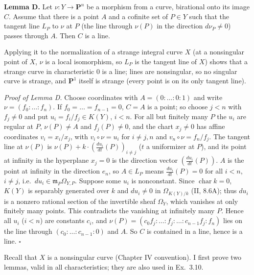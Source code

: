\documentclass[11pt]{article}
\begin{document}
\textbf{Lemma D.} Let $\nu:Y\to\mathbf P^n$ be a morphism from a curve, birational onto its image $C$. Assume that there is a point $A$ and a cofinite set of $P\in Y$ such that the tangent line $L_P$ to $\nu$ at $P$ (the line through $\nu(P)$ in the direction $d\nu_P\ne0$) passes through $A$. Then $C$ is a line.

Applying it to the normalization of a strange integral curve $X$ (at a nonsingular point of $X$, $\nu$ is a local isomorphism, so $L_P$ is the tangent line of $X$) shows that a strange curve in characteristic $0$ is a line; lines are nonsingular, so no singular curve is strange, and $\mathbf P^1$ itself is strange (every point is on its only tangent line).

\emph{Proof of Lemma D.} Choose coordinates with $A=(0:\dots:0:1)$ and write $\nu=(f_0:\dots:f_n)$. If $f_0=\dots=f_{n-1}=0$, $C=A$ is a point; so choose $j<n$ with $f_j\ne0$ and put $u_i=f_i/f_j\in K(Y)$, $i<n$. For all but finitely many $P$ the $u_i$ are regular at $P$, $\nu(P)\ne A$ and $f_j(P)\ne0$, and the chart $x_j\ne0$ has affine coordinates $v_i=x_i/x_j$, with $v_i\circ\nu=u_i$ for $i\neq j,n$ and $v_n\circ\nu=f_n/f_j$. The tangent line at $\nu(P)$ is $\nu(P)+k\cdot(\frac{du_i}{dt}(P))_{i\ne j}$ ($t$ a uniformizer at $P$), and its point at infinity in the hyperplane $x_j=0$ is the direction vector $(\frac{du_i}{dt}(P))$. $A$ is the point at infinity in the direction $e_n$, so $A\in L_P$ means $\frac{du_i}{dt}(P)=0$ for all $i<n$, $i\ne j$, i.e.\ $du_i\in\mathfrak m_P\Omega_{Y,P}$. Suppose some $u_i$ is nonconstant. Since $\operatorname{char}k=0$, $K(Y)$ is separably generated over $k$ and $du_i\ne0$ in $\Omega_{K(Y)/k}$ (II, 8.6A); thus $du_i$ is a nonzero rational section of the invertible sheaf $\Omega_Y$, which vanishes at only finitely many points. This contradicts the vanishing at infinitely many $P$. Hence all $u_i$ ($i<n$) are constants $c_i$, and $\nu(P)=(c_0f_j:\dots:f_j:\dots:c_{n-1}f_j:f_n)$ lies on the line through $(c_0:\dots:c_{n-1}:0)$ and $A$. So $C$ is contained in a line, hence is a line. \hfill$\square$

\pf
Recall that $X$ is a nonsingular curve (Chapter IV convention). I first prove two lemmas, valid in all characteristics; they are also used in Ex.~3.10.
\end{document}
